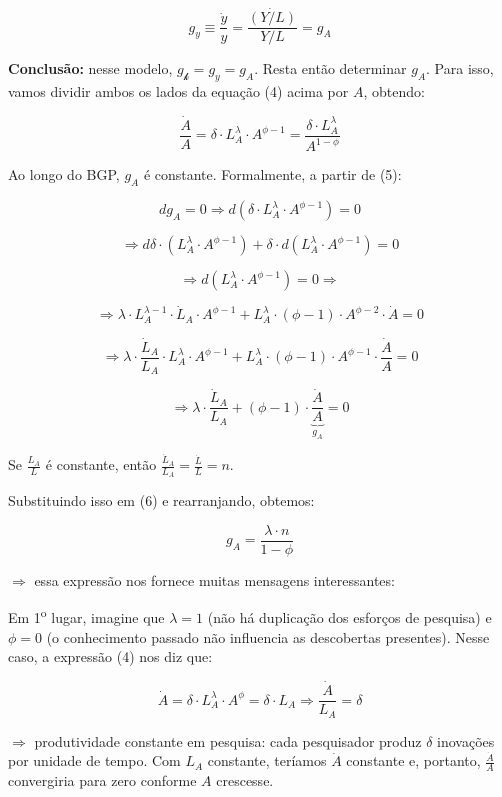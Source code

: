 \documentclass[a4paper,12pt]{article}[abntex2]
\begin{document}
\[
g_y \equiv \frac{\dot{y}}{y} = \frac{\dot{(Y/L)}}{Y/L} = g_A
\]

\textbf{Conclusão:} nesse modelo, \( g_\mathcal{k} = g_y = g_A \). Resta então determinar \( g_A \). Para isso, vamos dividir ambos os lados da equação (4) acima por \( A \), obtendo:

\[
\frac{\dot{A}}{A} = \delta \cdot L_A^\lambda \cdot A^{\phi - 1}
= \frac{\delta \cdot L_A^\lambda}{A^{1 - \phi}} \tag{5}
\]

Ao longo do BGP, \( g_A \) é constante. Formalmente, a partir de (5):

\[
d g_A = 0 \Rightarrow d(\delta \cdot L_A^\lambda \cdot A^{\phi - 1}) = 0
\]

\[
\Rightarrow d\delta \cdot (L_A^\lambda \cdot A^{\phi - 1}) + \delta \cdot d(L_A^\lambda \cdot A^{\phi - 1}) = 0
\]

\[
\Rightarrow d(L_A^\lambda \cdot A^{\phi - 1}) = 0 \Rightarrow
\]

\[
\Rightarrow \lambda \cdot L_A^{\lambda - 1} \cdot \dot{L}_A \cdot A^{\phi - 1}
+ L_A^\lambda \cdot (\phi - 1) \cdot A^{\phi - 2} \cdot \dot{A} = 0
\]

\[
\Rightarrow \lambda \cdot \frac{\dot{L}_A}{L_A} \cdot L_A^\lambda \cdot A^{\phi - 1}
+ L_A^\lambda \cdot (\phi - 1) \cdot A^{\phi - 1} \cdot \frac{\dot{A}}{A} = 0
\]

\[
\Rightarrow \lambda \cdot \frac{\dot{L}_A}{L_A} + (\phi - 1) \cdot \underbrace{\frac{\dot{A}}{A}}_{g_A} = 0 \tag{6}
\]

Se \( \frac{L_A}{L} \) é constante, então \( \frac{\dot{L}_A}{L_A} = \frac{\dot{L}}{L} = n \).

Substituindo isso em (6) e rearranjando, obtemos:

\[
g_A = \frac{\lambda \cdot n}{1 - \phi} \tag{7}
\]

\(\Rightarrow\) essa expressão nos fornece muitas mensagens interessantes:

Em 1\textsuperscript{o} lugar, imagine que \( \lambda = 1 \) (não há duplicação dos esforços de pesquisa) e \( \phi = 0 \) (o conhecimento passado não influencia as descobertas presentes). Nesse caso, a expressão (4) nos diz que:

\[
\dot{A} = \delta \cdot L_A^\lambda \cdot A^\phi = \delta \cdot L_A \Rightarrow \frac{\dot{A}}{L_A} = \delta
\]

\(\Rightarrow\) produtividade constante em pesquisa: cada pesquisador produz \( \delta \) inovações por unidade de tempo. Com \( L_A \) constante, teríamos \( \dot{A} \) constante e, portanto, \( \frac{\dot{A}}{A} \) convergiria para zero conforme \( A \) crescesse.
\end{document}
